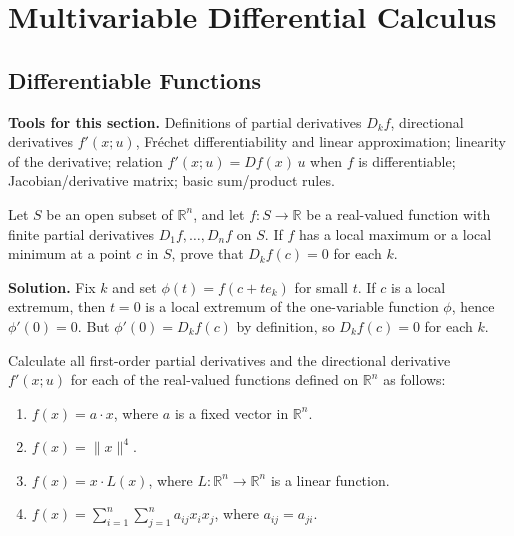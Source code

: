 \chapter{Multivariable Differential Calculus}

\section{Differentiable Functions}

\noindent\textbf{Tools for this section.} Definitions of partial derivatives $D_k f$, directional derivatives $f'(x;u)$, Fréchet differentiability and linear approximation; linearity of the derivative; relation $f'(x;u)=Df(x)\,u$ when $f$ is differentiable; Jacobian/derivative matrix; basic sum/product rules.

\begin{problembox}
Let \( S \) be an open subset of \( \mathbb{R}^n \), and let \( f: S \to \mathbb{R} \) be a real-valued function with finite partial derivatives \( D_1f, \ldots, D_nf \) on \( S \). If \( f \) has a local maximum or a local minimum at a point \( c \) in \( S \), prove that \( D_kf(c) = 0 \) for each \( k \).
\end{problembox}

\noindent\textbf{Solution.}
Fix $k$ and set $\phi(t)=f(c+te_k)$ for small $t$. If $c$ is a local extremum, then $t=0$ is a local extremum of the one-variable function $\phi$, hence $\phi'(0)=0$. But $\phi'(0)=D_k f(c)$ by definition, so $D_k f(c)=0$ for each $k$.

\begin{problembox}
Calculate all first-order partial derivatives and the directional derivative \( f'(x; u) \) for each of the real-valued functions defined on \( \mathbb{R}^n \) as follows:
\begin{enumerate}[label=(\alph*)]
\item \( f(x) = a \cdot x \), where \( a \) is a fixed vector in \( \mathbb{R}^n \).
\item \( f(x) = \|x\|^4 \).
\item \( f(x) = x \cdot L(x) \), where \( L : \mathbb{R}^n \to \mathbb{R}^n \) is a linear function.
\item \( f(x) = \sum_{i=1}^{n} \sum_{j=1}^{n} a_{ij}x_i x_j \), where \( a_{ij} = a_{ji} \).
\end{enumerate}
\end{problembox}

